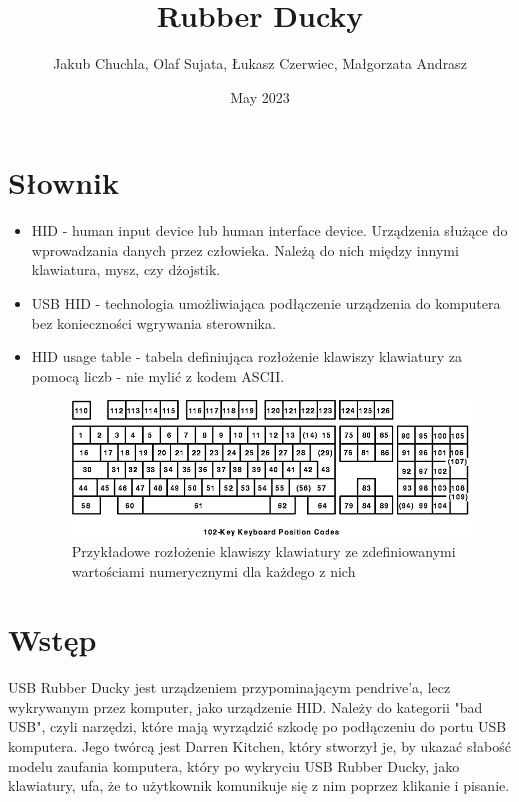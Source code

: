 \documentclass{article}
\title{Rubber Ducky}
\author{Jakub Chuchla, Olaf Sujata, Łukasz Czerwiec, Małgorzata Andrasz}
\date{May 2023}
\begin{document}
\maketitle

\tableofcontents
\newpage
\section{Słownik}
\begin{itemize}
    \item HID - human input device lub human interface device. Urządzenia służące do wprowadzania danych przez człowieka. Należą do nich między innymi klawiatura, mysz, czy dżojstik.
    \item USB HID - technologia umożliwiająca podłączenie urządzenia do komputera bez konieczności wgrywania sterownika.
    \item HID usage table - tabela definiująca rozłożenie klawiszy klawiatury za pomocą liczb - nie mylić z kodem ASCII.
    \begin{figure}[h]
    \centering
    \includegraphics[scale=0.3]{Media/HID.png}
    \caption{Przykładowe rozłożenie klawiszy klawiatury ze zdefiniowanymi wartościami numerycznymi dla każdego z nich}
    \label{fig:enter-label}
    \end{figure}
    
\end{itemize}

\section{Wstęp}

USB Rubber Ducky jest urządzeniem przypominającym pendrive'a, lecz wykrywanym przez komputer, jako urządzenie HID. Należy do kategorii "bad USB", czyli narzędzi, które mają wyrządzić szkodę po podłączeniu do portu USB komputera. Jego twórcą jest Darren Kitchen, który stworzył je, by ukazać słabość modelu zaufania komputera, który po wykryciu USB Rubber Ducky, jako klawiatury, ufa, że to użytkownik komunikuje się z nim poprzez klikanie i pisanie.
\end{document}
